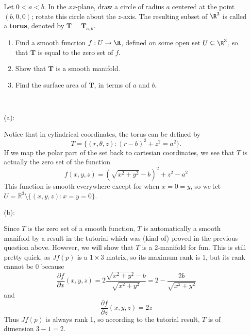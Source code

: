 \documentclass{../../../tex-setup/eh-homework}
\begin{document}
    \begin{question}{41}
        Let $0<a<b$. In the $xz$-plane, draw a circle of radius $a$ centered at the point $(b,0,0)$; rotate this circle about the $z$-axis. The resulting subset of $\R^3$ is called a \textbf{torus}, denoted by $\mathbf{T}=\mathbf{T}_{a,b}$.
        \begin{enumerate}[label=(\alph*)]
            \item Find a smooth function $f:U\rightarrow \R$, defined on some open set $U\subseteq \R^3$, so that $\mathbf{T}$ is equal to the zero set of $f$.
            
            \item Show that $\mathbf{T}$ is a smooth manifold.
            
            \item Find the surface area of $\mathbf{T}$, in terms of $a$ and $b$.
        \end{enumerate}
        \tcblower
        \ 

        (a):

        Notice that in cylindrical coordinates, the torus can be defined by
        \[
            T = \{ (r, \theta, z) : (r - b)^2 + z^2 = a^2\}.
        \]
        If we map the polar part of the set back to cartesian coordinates, we see that \(T\) is actually the zero set of the function
        \[
            f(x,y,z) = (\sqrt{x^2 + y^2} - b)^2 + z^2 - a^2
        \]
        This function is smooth everywhere except for when \(x = 0 = y\), so we let \(U = \mathbb{R}^3 \setminus \{ (x,y,z) : x = y = 0 \}\).

        \medskip

        (b):

        Since \(T\) is the zero set of a smooth function, \(T\) is automatically a smooth manifold by a result in the tutorial which was (kind of) proved in the previous question above. However, we will show that \(T\) is a 2-manifold for fun. This is still pretty quick, as \(Jf(p)\) is a \(1 \times 3\) matrix, so its maximum rank is 1, but its rank cannot be 0 because
        \[
            \frac{\partial f}{\partial x} (x,y,z) = 2\frac{\sqrt{x^2 + y^2} - b}{\sqrt{x^2 + y^2}} = 2 - \frac{2b}{\sqrt{x^2 + y^2}}
        \]
        and
        \[
            \frac{\partial f}{\partial z} (x,y,z) = 2z
        \]
        Thus \(Jf(p)\) is always rank 1, so according to the tutorial result, \(T\) is of dimension \(3 - 1 = 2\).
    \end{question}
\end{document}
